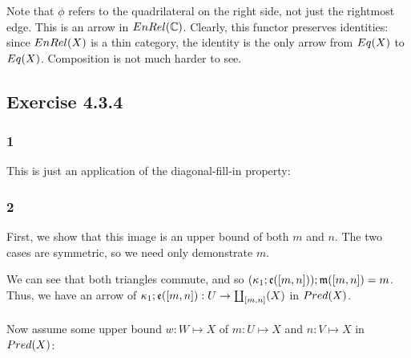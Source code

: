 \documentclass{article}
\begin{document}
Note that $\phi$ refers to the quadrilateral on the right side, not just the rightmost edge. This is an arrow in $\mit{EnRel}(\mathbb C)$. Clearly, this functor preserves identities: since $\mit{EnRel}(X)$ is a thin category, the identity is the only
arrow from $\mit{Eq}(X)$ to $\mit{Eq}(X)$. Composition is not much harder to see.

\subsection*{Exercise 4.3.4}

\subsubsection*{1}

This is just an application of the diagonal-fill-in property:

\begin{center}
\end{center}

\subsubsection*{2}

First, we show that this image is an upper bound of both $m$ and $n$. The two cases are symmetric, so we need only 
demonstrate $m$.

\begin{center}
\end{center}

We can see that both triangles commute, and so $(\kappa_1;\frak e([m,n]));\frak m([m,n]) = m$. Thus, we have an arrow
of $\kappa_1;\frak e([m,n]) : U \to \coprod_{[m,n]}(X)$ in $\mit{Pred}(X)$.\\~\\
Now assume some upper bound $w : W \mapsto X$ of $m : U \mapsto X$ and $n : V \mapsto X$ in $\mit{Pred}(X)$:
\end{document}
